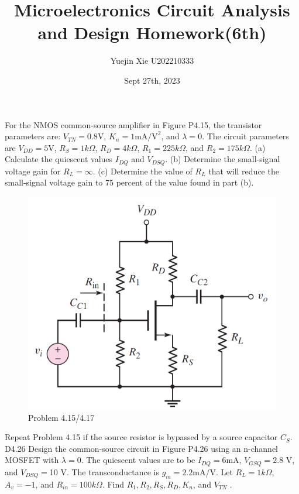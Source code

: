 \documentclass[a4paper,11pt,UTF8]{article}
\title{Microelectronics Circuit Analysis and Design Homework(6th)}
\author{Yuejin Xie \quad U202210333}
\date{Sept 27th, 2023}
\begin{document}
\maketitle
{} For the NMOS common-source amplifier in Figure P4.15, the transistor
parameters are: $V_{T N }= 0.8$V, $K_n = 1\text{mA/V}^2$, and $\lambda = 0$. The circuit parameters
are $V_{DD} = 5 $V, $R_S = 1 k\Omega$, $R_D = 4 k\Omega$, $R_1 = 225 k\Omega$, and
$R_2 = 175 k\Omega$. (a) Calculate the quiescent values $I_{DQ}$ and $V_{DSQ}$. (b) Determine
the small-signal voltage gain for $R_L =\infty$. (c) Determine the value of
$R_L$ that will reduce the small-signal voltage gain to 75 percent of the value
found in part (b).\\
\begin{figure}[H] 
	\centering 
	\includegraphics[scale=0.3]{MD4.15.png}
	\caption{Problem 4.15/4.17}
\end{figure}
 Repeat Problem 4.15 if the source resistor is bypassed by a source capacitor
$C_S$.\\
D4.26 Design the common-source circuit in Figure P4.26 using an n-channel
MOSFET with $\lambda = 0$. The quiescent values are to be $I_{DQ} = 6 $mA,
$V_{GSQ} = 2.8$ V, and $V_{DSQ} = $10 V. The transconductance is $g_m = 2.2 $mA/V.
Let $R_L = 1 k\Omega$, $A_v = -1$, and $R_{in} = 100 k\Omega$. Find $R_1, R_2, R_S, R_D, K_n$, and $V_{T N}$ .\\
\end{document}
